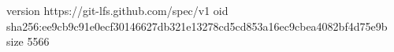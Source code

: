version https://git-lfs.github.com/spec/v1
oid sha256:ee9cb9c91e0ecf30146627db321e13278cd5cd853a16ec9cbea4082bf4d75e9b
size 5566
